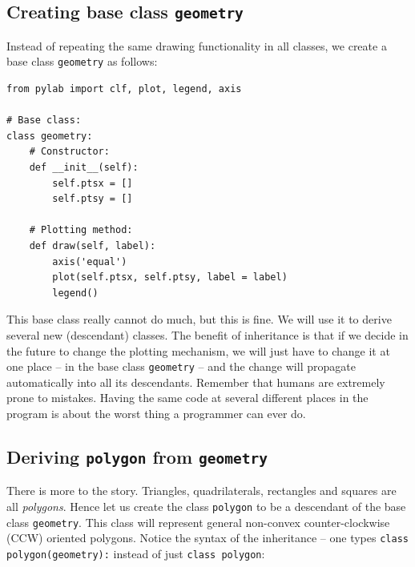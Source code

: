 \subsection{Creating base class {\tt geometry}}

Instead of repeating the same drawing functionality in all classes, we create 
a base class {\tt geometry} as follows:

\begin{verbatim}
from pylab import clf, plot, legend, axis

# Base class:
class geometry:
    # Constructor:
    def __init__(self):
        self.ptsx = []
        self.ptsy = []
      
    # Plotting method:
    def draw(self, label):
        axis('equal')
        plot(self.ptsx, self.ptsy, label = label)
        legend()
\end{verbatim}
This base class really cannot do much, but this is fine. We will use it to 
derive several new (descendant) classes. The benefit of inheritance is that if 
we decide in the future to change the plotting mechanism, we will just have to change it at 
one place -- in the base class {\tt geometry} -- and the change will propagate automatically 
into all its descendants. Remember that humans are extremely prone to mistakes. Having the 
same code at several different places in the program is about the worst thing a programmer 
can ever do. 

\subsection{Deriving {\tt polygon} from {\tt geometry}}

There is more to the story. Triangles, quadrilaterals, rectangles and squares are all 
{\em polygons}. Hence let us create the class {\tt polygon} to be a descendant 
of the base class {\tt geometry}. This class will represent general non-convex
counter-clockwise (CCW) oriented polygons. Notice the syntax of the inheritance -- 
one types {\tt class polygon(geometry):} instead of just {\tt class polygon}:

